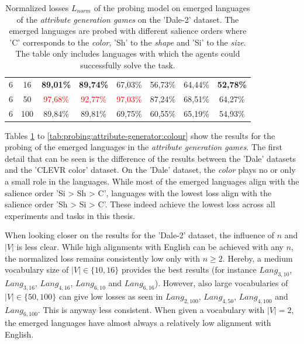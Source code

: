 \begin{table}[ht]
\begin{tabular}{cc|c|c|c|c|c|c}
        {6} & {16}  & \textbf{89,01\%}         & \textbf{89,74\%}         & {67,03\%}                & {56,73\%}                & {64,44\%}                 & \textbf{52,78\%}          \\
        {6} & {50}  & \textcolor{red}{97,68\%} & \textcolor{red}{92,77\%} & \textcolor{red}{97,03\%} & {87,24\%}                & {68,51\%}                 & {64,27\%}                 \\
        {6} & {100} & {89,84\%}                & {89,81\%}                & {69,75\%}                & {60,55\%}                & {65,19\%}                 & {54,93\%}                 \\
        \bottomrule
    \end{tabular}
    \caption{Normalized losses $L_{norm}$ of the probing model on emerged languages of the \emph{attribute generation games} on the 'Dale-2' dataset. The emerged languages are probed with different salience orders where 'C' corresponds to the \emph{color}, 'Sh' to the \emph{shape} and 'Si' to the \emph{size}. The table only includes languages with which the agents could successfully solve the task.}
    \label{tab:probing:attribute-generator:dale-2}
\end{table}

Tables \ref{tab:probing:attribute-generator:dale-2} to \ref{tab:probing:attribute-generator:colour} show the results for the probing of the emerged languages in the \emph{attribute generation games}.
The first detail that can be seen is the difference of the results between the 'Dale' datasets and the 'CLEVR color' dataset.
On the 'Dale' dataset, the \emph{color} plays no or only a small role in the languages.
While most of the emerged languages align with the salience order 'Si > Sh > C', languages with the lowest loss align with the salience order 'Sh > Si > C'.
These indeed achieve the lowest loss across all experiments and tasks in this thesis.

When looking closer on the results for the 'Dale-2' dataset, the influence of $n$ and $|V|$ is less clear.
While high alignments with English can be achieved with any $n$, the normalized loss remains consistently low only with $n \geq 2$.
Hereby, a medium vocabulary size of $|V| \in \{10,16\}$ provides the best results (for instance $Lang_{3,10}$, $Lang_{3,16}$, $Lang_{4,16}$, $Lang_{6,10}$ and $Lang_{6,16}$).
However, also large vocabularies of $|V| \in \{50,100\}$ can give low losses as seen in $Lang_{2,100}$, $Lang_{4,50}$, $Lang_{4,100}$ and $Lang_{6,100}$.
This is anyway less consistent.
When given a vocabulary with $|V|=2$, the emerged languages have almost always a relatively low alignment with English.

